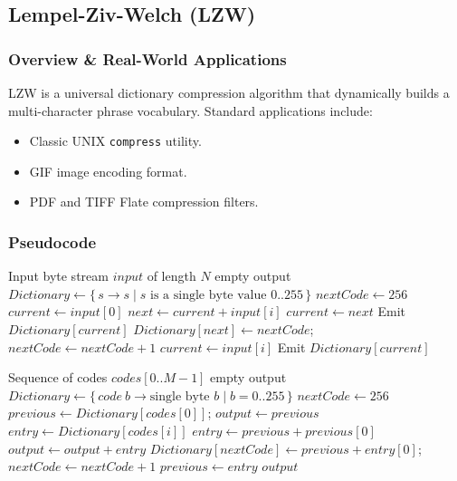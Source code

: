 \documentclass{article}
\begin{document}
\cleardoublepage
\newpage

\subsection{Lempel-Ziv-Welch (LZW)}

\subsubsection{Overview \& Real-World Applications}
LZW is a universal dictionary compression algorithm that dynamically builds a multi-character phrase vocabulary. Standard applications include:
\begin{itemize}
    \item Classic UNIX \texttt{compress} utility.
    \item GIF image encoding format.
    \item PDF and TIFF Flate compression filters.
\end{itemize}

\subsubsection{Pseudocode}
\begin{algorithm}[H]
\caption{LZW Compression}
\label{alg:lzw_compress}
\begin{algorithmic}[1]
\REQUIRE Input byte stream $input$ of length $N$
 \RETURN empty output \ENDIF
\STATE $Dictionary \gets \{\, s \to s \mid s \text{ is a single byte value } 0..255 \,\}$
\STATE $nextCode \gets 256$
\STATE $current \gets input[0]$
    \STATE $next \gets current + input[i]$
        \STATE $current \gets next$
    \ELSE
        \STATE Emit $Dictionary[current]$
            \STATE $Dictionary[next] \gets nextCode$; $nextCode \gets nextCode + 1$
        \ENDIF
        \STATE $current \gets input[i]$
    \ENDIF
\ENDFOR
\STATE Emit $Dictionary[current]$
\end{algorithmic}
\end{algorithm}

\begin{algorithm}[H]
\caption{LZW Decompression}
\label{alg:lzw_decompress}
\begin{algorithmic}[1]
\REQUIRE Sequence of codes $codes[0..M-1]$
 \RETURN empty output \ENDIF
\STATE $Dictionary \gets \{\, code\ b \to \text{single byte } b \mid b = 0..255 \,\}$
\STATE $nextCode \gets 256$
\STATE $previous \gets Dictionary[codes[0]]$; $output \gets previous$
        \STATE $entry \gets Dictionary[codes[i]]$
    \ELSE
        \STATE $entry \gets previous + previous[0]$
    \ENDIF
    \STATE $output \gets output + entry$
        \STATE $Dictionary[nextCode] \gets previous + entry[0]$; $nextCode \gets nextCode + 1$
    \ENDIF
    \STATE $previous \gets entry$
\ENDFOR
\RETURN $output$
\end{algorithmic}
\end{algorithm}
\end{document}

